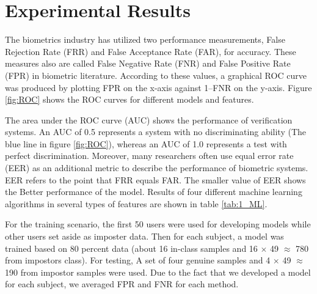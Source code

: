 


 

\section{Experimental Results}
The biometrics industry has utilized two performance measurements, False Rejection Rate (FRR) and False Acceptance Rate (FAR), for accuracy. These measures also are called False Negative Rate (FNR) and False Positive Rate (FPR) in biometric literature. According to these values, a graphical ROC curve was produced by plotting FPR on the x-axis against 1–FNR on the y-axis. Figure \ref{fig:ROC} shows the ROC curves for different models and features. 

The area under the ROC curve (AUC) shows the performance of verification systems. An AUC of 0.5 represents a system with no discriminating ability (The blue line in figure \ref{fig:ROC}), whereas an AUC of 1.0 represents a test with perfect discrimination. Moreover, many researchers often use equal error rate (EER) as an additional metric to describe the performance of biometric systems. EER refers to the point that FRR equals FAR. The smaller value of EER shows the Better performance of the model. Results of four different machine learning algorithms in several types of features are shown in table \ref{tab:1_ML}.


For the training scenario, the first 50 users were used for developing models while other users set aside as imposter data. Then for each subject, a model was trained based on 80 percent data (about 16 in-class samples and 16 $\times$ 49 $\approx$ 780 from impostors class). For testing, A set of four genuine samples and 4 $\times$ 49 $\approx$ 190 from impostor samples were used. Due to the fact that we developed a model for each subject, we averaged FPR and FNR for each method.

